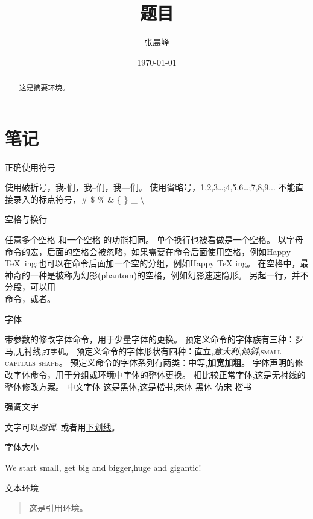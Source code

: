 \documentclass[UTF8,a4paper,12pt]{article}
\title{题目}
\author{张晨峰}
\date{\today}
\begin{document}
\maketitle

\section{笔记}

正确使用符号

使用破折号，我-们，我--们，我---们。
使用省略号，1,2,3\ldots;4,5,6\dots;7,8,9...
不能直接录入的标点符号，\# \quad \$ \quad \% \quad \& \quad \{ \quad \} \quad \_ \quad \textbackslash


空格与换行

任意多个空格     和一个空格 的功能相同。
单个换行也被看做是一个空格。
以字母命令的宏，后面的空格会被忽略，如果需要在命令后面使用空格，例如Happy \TeX\ ing;也可以在命令后面加一个空的分组{}，例如Happy \TeX{} ing。
在空格中，最神奇的一种是被称为幻影(phantom)的空格，例如幻影\phantom{我是空格}速速隐形。
另起一行，并不分段，可以用\\命令，或者。


字体

带参数的修改字体命令，用于少量字体的更换。
预定义命令的字体族有三种：\textrm{罗马},\textsf{无衬线},\texttt{打字机}。
预定义命令的字体形状有四种：\textup{直立},\textit{意大利},\textsl{倾斜},\textsc{small capitals shape}。
预定义命令的字体系列有两类：\textmd{中等},\textbf{加宽加粗}。
字体声明的修改字体命令，用于分组或环境中字体的整体更换。
\sffamily
\textnormal{相比较正常字体},这是无衬线的整体修改方案。
\rmfamily
中文字体
{这是黑体},{这是楷书},{\songti 宋体 \quad \heiti 黑体 \quad \fangsong 仿宋 \quad \kaishu 楷书}


强调文字

\rmfamily
文字可以\emph{强调}, 或者用\underline{下划线}。


字体大小

\noindent\tiny We \scriptsize start \footnotesize \small small,
\normalsize get \large big \Large and \LARGE bigger,\huge huge and \Huge gigantic!

\normalsize


文本环境

\begin{quote}
  这是引用环境。
\end{quote}

\begin{abstract}
  这是摘要环境。
\end{abstract}
\end{document}
